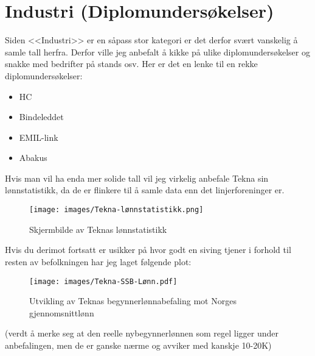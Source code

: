 \section{Industri (Diplomundersøkelser)}

Siden <<Industri>> er en såpass stor kategori er det derfor svært vanskelig å samle tall herfra. Derfor ville jeg anbefalt å kikke på ulike diplomundersøkelser og snakke med bedrifter på stands osv. Her er det en lenke til en rekke diplomundersøkelser:

\begin{itemize}
    \item HC \cite{hc_ntnu_diplom_2022}
    \item Bindeleddet \cite{bindeleddet_documents_archive}
    \item EMIL-link \cite{emil_diplom_2023}
    \item Abakus \cite{abakus_utmatrikuleringsundersokelse}
\end{itemize}

Hvis man vil ha enda mer solide tall vil jeg virkelig anbefale Tekna sin lønnstatistikk, da de er flinkere til å samle data enn det linjerforeninger er. 

\begin{figure}[H]
    \centering
    \texttt{[image: images/Tekna-lønnstatistikk.png]}
    \caption{Skjermbilde av Teknas lønnstatistikk}
\end{figure}

Hvis du derimot fortsatt er usikker på hvor godt en siving tjener i forhold til resten av befolkningen har jeg laget følgende plot:

\begin{figure}[H]
    \centering
    \texttt{[image: images/Tekna-SSB-Lønn.pdf]}
    \caption{Utvikling av Teknas begynnerlønnabefaling mot Norges gjennomsnittlønn}
\end{figure}

(verdt å merke seg at den reelle nybegynnerlønnen som regel ligger under anbefalingen, men de er ganske nærme og avviker med kanskje 10-20K)

